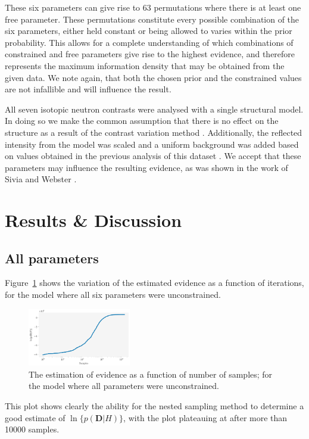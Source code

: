 \documentclass[%
 reprint,
 superscriptaddress,
 amsmath,amssymb,
 aps,
]{revtex4-1}
\begin{document}
%
These six parameters can give rise to \num{63} permutations where there is at least one free parameter. 
These permutations constitute every possible combination of the six parameters, either held constant or being allowed to varies within the prior probability. 
This allows for a complete understanding of which combinations of constrained and free parameters give rise to the highest evidence, and therefore represents the maximum information density that may be obtained from the given data.
We note again, that both the chosen prior and the constrained values are not infallible and will influence the result. 

All seven isotopic neutron contrasts were analysed with a single structural model. 
In doing so we make the common assumption that there is no effect on the structure as a result of the contrast variation method \cite{nelson_motofit_2006}. 
Additionally, the reflected intensity from the model was scaled and a uniform background was added based on values obtained in the previous analysis of this dataset \cite{mccluskey_assessing_2019}. 
We accept that these parameters may influence the resulting evidence, as was shown in the work of Sivia and Webster \cite{sivia_bayesian_1998}.

\section{\label{results} Results \& Discussion}

\subsection{All parameters}
Figure~\ref{fig:iterations} shows the variation of the estimated evidence as a function of iterations, for the model where all six parameters were unconstrained. 
%
\begin{figure}
\includegraphics[width=0.4\textwidth]{iterations}
\caption{\label{fig:iterations} The estimation of evidence as a function of number of samples; for the model where all parameters were unconstrained.}
\end{figure}
%
This plot shows clearly the ability for the nested sampling method to determine a good estimate of $\ln\{p(\mathbf{D}|H)\}$, with the plot plateauing at \unskip\;after more than \num{10000} samples.
\end{document}
